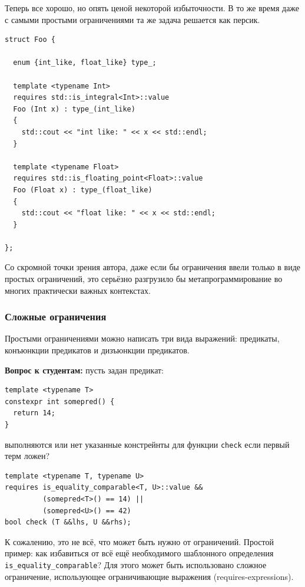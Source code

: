 \documentclass[a4paper,12pt,oneside]{article}
\newif\ifanswers
\begin{document}
Теперь все хорошо, но опять ценой некоторой избыточности. В то же время даже с самыми простыми ограничениями та же задача решается как персик.

\begin{lstlisting}
struct Foo {

  enum {int_like, float_like} type_;

  template <typename Int>
  requires std::is_integral<Int>::value
  Foo (Int x) : type_(int_like)
  {
    std::cout << "int like: " << x << std::endl;
  }

  template <typename Float>
  requires std::is_floating_point<Float>::value
  Foo (Float x) : type_(float_like)
  {
    std::cout << "float like: " << x << std::endl;
  }

};
\end{lstlisting}

Со скромной точки зрения автора, даже если бы ограничения ввели только в виде простых ограничений, это серьёзно разгрузило бы метапрограммирование во многих практически важных контекстах.

\subsubsection{Сложные ограничения}

Простыми ограничениями можно написать три вида выражений: предикаты, конъюнкции предикатов и дизъюнкции предикатов.

\textbf{Вопрос к студентам:} пусть задан предикат:

\begin{lstlisting}
template <typename T>
constexpr int somepred() {
  return 14;
}
\end{lstlisting}

выполняются или нет указанные констрейнты для функции \lstinline!check! если первый терм ложен?

\begin{lstlisting}
template <typename T, typename U>
requires is_equality_comparable<T, U>::value &&
         (somepred<T>() == 14) || 
         (somepred<U>() == 42)
bool check (T &&lhs, U &&rhs);
\end{lstlisting}

\ifanswers
Правильный ответ: конечно нет, так как \lstinline!false && true || false! по обычной схеме дает false
\fi

К сожалению, это не всё, что может быть нужно от ограничений. Простой пример: как избавиться от всё ещё необходимого шаблонного определения \lstinline!is_equality_comparable!? Для этого может быть использовано сложное ограничение, использующее ограничивающие выражения (requires-expressions).
\end{document}
